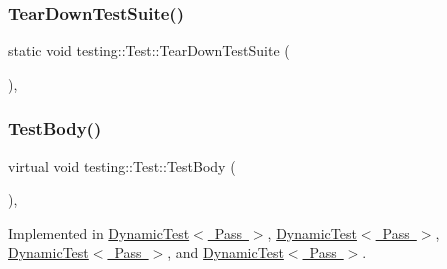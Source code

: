 \mbox{\label{classtesting_1_1_test_a7704c8223ba28338a66ca2eaeba66383}} 
\subsubsection{\texorpdfstring{TearDownTestSuite()}{TearDownTestSuite()}\hspace{0.1cm}{\footnotesize\ttfamily [2/2]}}
{\footnotesize\ttfamily static void testing\+::\+Test\+::\+Tear\+Down\+Test\+Suite (\begin{DoxyParamCaption}{ }\end{DoxyParamCaption})\hspace{0.3cm}{\ttfamily [inline]}, {\ttfamily [static]}}

\mbox{\label{classtesting_1_1_test_a146a4a5d9854e676d625a0ef67409794}} 
\subsubsection{\texorpdfstring{TestBody()}{TestBody()}\hspace{0.1cm}{\footnotesize\ttfamily [1/3]}}
{\footnotesize\ttfamily virtual void testing\+::\+Test\+::\+Test\+Body (\begin{DoxyParamCaption}{ }\end{DoxyParamCaption})\hspace{0.3cm}{\ttfamily [private]}, {}}



Implemented in \mbox{\hyperlink{class_dynamic_test_afc4a0a94673a3d37709f9cd03e82b821}{Dynamic\+Test$<$ Pass $>$}}, \mbox{\hyperlink{class_dynamic_test_afc4a0a94673a3d37709f9cd03e82b821}{Dynamic\+Test$<$ Pass $>$}}, \mbox{\hyperlink{class_dynamic_test_afc4a0a94673a3d37709f9cd03e82b821}{Dynamic\+Test$<$ Pass $>$}}, and \mbox{\hyperlink{class_dynamic_test_afc4a0a94673a3d37709f9cd03e82b821}{Dynamic\+Test$<$ Pass $>$}}.

\mbox{\label{classtesting_1_1_test_a146a4a5d9854e676d625a0ef67409794}} 

